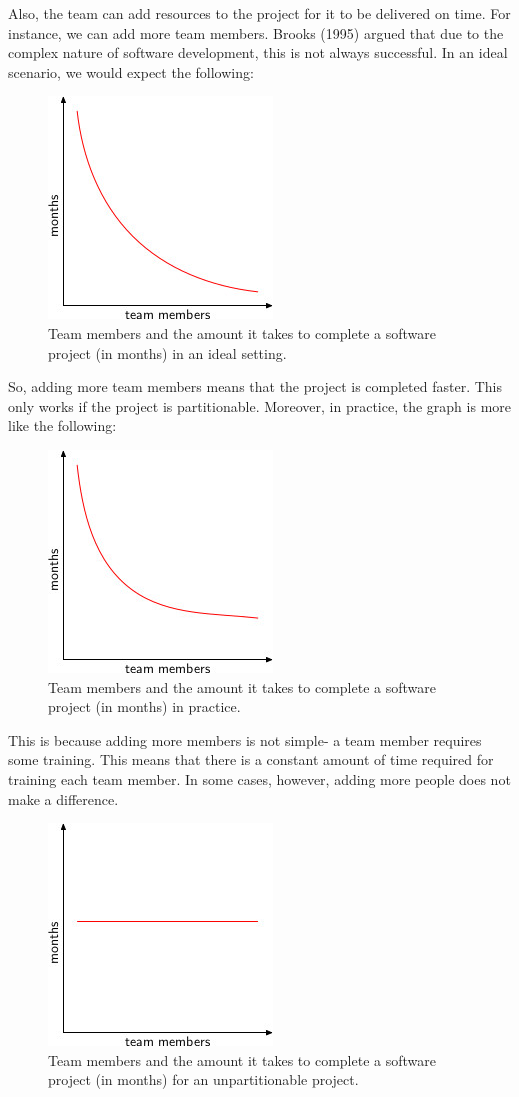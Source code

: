 \documentclass[a4paper, openany]{memoir}
\begin{document}
Also, the team can add resources to the project for it to be delivered on time. For instance, we can add more team members. Brooks (1995) argued that due to the complex nature of software development, this is not always successful. In an ideal scenario, we would expect the following:
\begin{figure}[H]
    \centering
    \includegraphics{src/2.3 Ideal.png}
    \caption{Team members and the amount it takes to complete a software project (in months) in an ideal setting.}
\end{figure}
\noindent So, adding more team members means that the project is completed faster. This only works if the project is partitionable. Moreover, in practice, the graph is more like the following:
\begin{figure}[H]
    \centering
    \includegraphics{src/2.4 WithTraining.png}
    \caption{Team members and the amount it takes to complete a software project (in months) in practice.}
\end{figure}
\noindent This is because adding more members is not simple- a team member requires some training. This means that there is a constant amount of time required for training each team member. In some cases, however, adding more people does not make a difference.
\begin{figure}[H]
    \centering
    \includegraphics{src/2.5 Unpartitionable.png}
    \caption{Team members and the amount it takes to complete a software project (in months) for an unpartitionable project.}
\end{figure}
\end{document}
